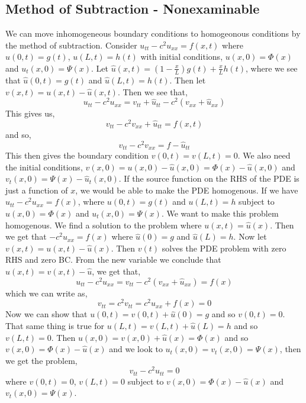 \subsection{Method of Subtraction - Nonexaminable}
We can move inhomogeneous boundary conditions to homogeonous conditions by the method of subtraction. Consider $u_{tt} - c^2u_{xx} = f(x, t)$ where $u(0, t) = g(t)$, $u(L, t) = h(t)$ with initial conditions, $u(x, 0) = \Phi(x)$ and $u_t(x, 0) = \Psi(x)$. Let $\hat u(x, t) = \left( 1 - \frac{x}{L}\right) g(t) + \frac{x}{L}h(t)$, where we see that $\hat u(0, t) = g(t)$ and $\hat u(L, t) = h(t)$. Then let $v(x, t) = u(x, t) - \hat u(x, t)$. Then we see that,
$$ u_{tt} - c^2u_{xx} = v_{tt} + \hat u_{tt} - c^2(v_{xx} + \hat u_{xx}) $$
This gives us,
$$ v_{tt} - c^2v_{xx} + \hat u_{tt} = f(x, t) $$
and so,
$$ v_{tt} - c^2v_{xx} = f - \hat u_{tt} $$
This then gives the boundary condition $v(0, t) = v(L, t) = 0$. We also need the initial conditions, $v(x, 0) = u(x, 0) - \hat u(x, 0) = \Phi(x) - \hat u(x, 0)$ and $v_t(x, 0) = \Psi(x) - \hat u_t(x, 0)$. If the source function on the RHS of the PDE is just a function of $x$, we would be able to make the PDE homogenous. If we have $u_{tt} - c^2u_{xx} = f(x)$, where $u(0, t) = g(t)$ and $u(L, t) = h$ subject to $u(x, 0) = \Phi(x)$ and $u_t(x, 0) = \Psi(x)$. We want to make this problem homogenous. We find a solution to the problem where $u(x, t) = \hat u(x)$. Then we get that $-c^2u_{xx} = f(x)$ where
$\hat u(0) = g$ and $\hat u(L) = h$. Now let $v(x, t) = u(x, t) - \hat u(x)$. Then $v(t)$ solves the PDE problem with zero RHS and zero BC. From the new variable we conclude that $u(x, t) = v(x, t) - \hat u$, we get that,
$$ u_{tt} - c^2u_{xx} = v_{tt} - c^2(v_{xx} + \hat u_{xx}) = f(x) $$
which we can write as,
$$ v_{tt} = c^2v_{tt} = c^2\hat u_{xx} + f(x) = 0$$
Now we can show that $u(0, t) = v(0, t) + \hat u(0) = g$ and so $v(0, t) = 0$. That same thing is true for $u(L, t) = v(L, t) + \hat u(L) = h$ and so $v(L, t) = 0$. Then $u(x, 0) = v(x, 0) + \hat u(x) = \Phi(x)$ and so $v(x, 0) = \Phi(x) - \hat u(x)$ and we look to $u_t (x, 0) = v_t(x, 0) = \Psi(x)$, then we get the problem,
$$ v_{tt} - c^2 u_{tt} = 0 $$
where $v(0, t) = 0$, $v(L, t) = 0$ subject to $v(x, 0) = \Phi (x) - \hat u(x)$ and $v_t(x, 0) = \Psi(x)$.

